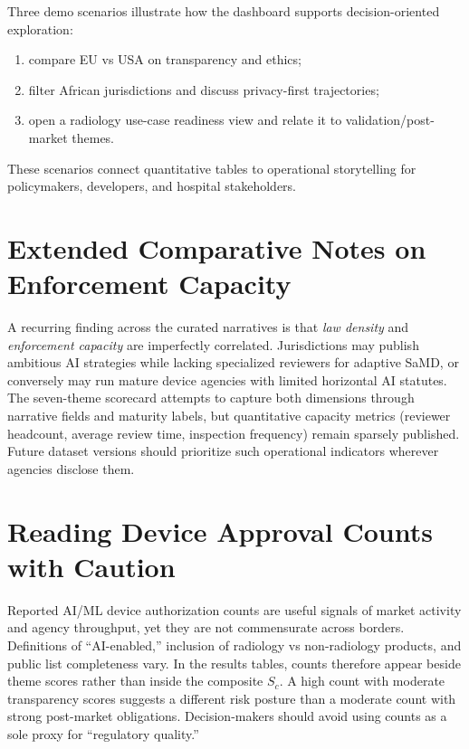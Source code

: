 Three demo scenarios illustrate how the dashboard supports decision-oriented exploration:
\begin{enumerate}[noitemsep]
  \item compare EU vs USA on transparency and ethics;
  \item filter African jurisdictions and discuss privacy-first trajectories;
  \item open a radiology use-case readiness view and relate it to validation/post-market themes.
\end{enumerate}
These scenarios connect quantitative tables to operational storytelling for policymakers, developers, and hospital stakeholders.

\section{Extended Comparative Notes on Enforcement Capacity}
\label{sec:enforcement}

A recurring finding across the curated narratives is that \emph{law density} and \emph{enforcement capacity} are imperfectly correlated. Jurisdictions may publish ambitious AI strategies while lacking specialized reviewers for adaptive SaMD, or conversely may run mature device agencies with limited horizontal AI statutes. The seven-theme scorecard attempts to capture both dimensions through narrative fields and maturity labels, but quantitative capacity metrics (reviewer headcount, average review time, inspection frequency) remain sparsely published. Future dataset versions should prioritize such operational indicators wherever agencies disclose them.

\section{Reading Device Approval Counts with Caution}
\label{sec:devicecounts}

Reported AI/ML device authorization counts are useful signals of market activity and agency throughput, yet they are not commensurate across borders. Definitions of ``AI-enabled,'' inclusion of radiology vs non-radiology products, and public list completeness vary. In the results tables, counts therefore appear beside theme scores rather than inside the composite $S_c$. A high count with moderate transparency scores suggests a different risk posture than a moderate count with strong post-market obligations. Decision-makers should avoid using counts as a sole proxy for ``regulatory quality.''

